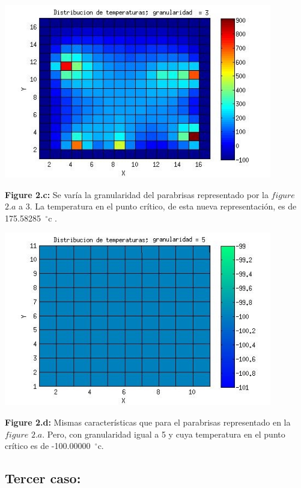 \documentclass[a4paper]{article}
\begin{document}
\includegraphics[width=\textwidth,height=3.0in,keepaspectratio
]{45x45h3.jpg} \newline
\begin {flushleft}
\textbf{Figure 2.c:} Se varía la granularidad del parabrisas representado por la $figure$ $2.a$ a 3. La temperatura en el punto crítico, de esta nueva representación, es de 175.58285\hspace{-1.5mm}$\phantom{a}^{\circ}$c .
\end{flushleft}

\includegraphics[width=\textwidth,height=3.0in,keepaspectratio
]{45x45h5.jpg} \newline
\begin {flushleft}
\textbf{Figure 2.d:} Mismas características que para el parabrisas representado en la $figure$ $2.a$. Pero, con granularidad igual a 5 y cuya temperatura en el punto crítico es de -100.00000\hspace{-1.5mm}$\phantom{a}^{\circ}$c.
\end{flushleft}


\subsection{Tercer caso:}
\end{document}
